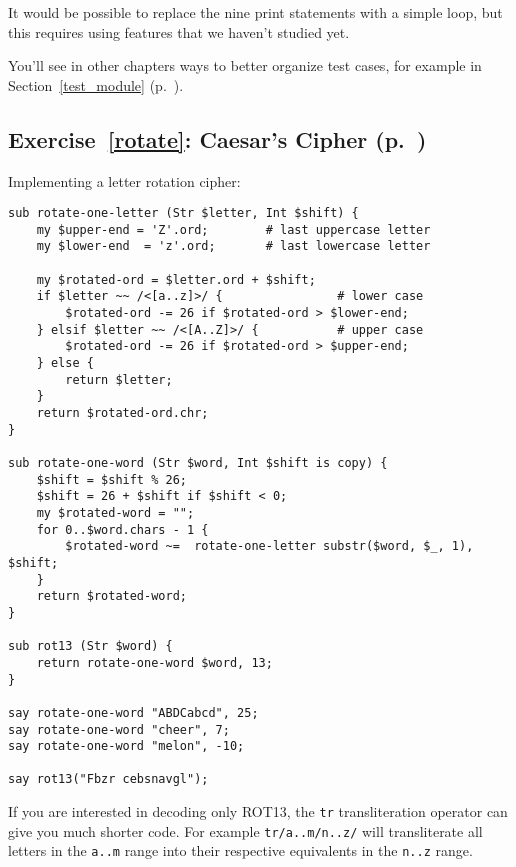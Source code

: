 It would be possible to replace the nine print statements 
with a simple loop, but this requires using features that we 
haven't studied yet.

You'll see in other chapters ways to better organize test cases,  
for example in Section~\ref{test_module} (p.~\pageref{test_module}).

\subsection{Exercise~\ref{rotate}: Caesar's Cipher (p.~\pageref{rotate})}
\label{sol_rotate}

Implementing a letter rotation cipher:

\begin{verbatim}
sub rotate-one-letter (Str $letter, Int $shift) {
    my $upper-end = 'Z'.ord;        # last uppercase letter
    my $lower-end  = 'z'.ord;       # last lowercase letter

    my $rotated-ord = $letter.ord + $shift;
    if $letter ~~ /<[a..z]>/ {                # lower case
        $rotated-ord -= 26 if $rotated-ord > $lower-end;
    } elsif $letter ~~ /<[A..Z]>/ {           # upper case
        $rotated-ord -= 26 if $rotated-ord > $upper-end;
    } else {
        return $letter;
    }
    return $rotated-ord.chr;
}

sub rotate-one-word (Str $word, Int $shift is copy) {
    $shift = $shift % 26;
    $shift = 26 + $shift if $shift < 0;
    my $rotated-word = "";
    for 0..$word.chars - 1 {
        $rotated-word ~=  rotate-one-letter substr($word, $_, 1), $shift;
    }
    return $rotated-word;
}

sub rot13 (Str $word) {
    return rotate-one-word $word, 13;
} 

say rotate-one-word "ABDCabcd", 25;
say rotate-one-word "cheer", 7;
say rotate-one-word "melon", -10;

say rot13("Fbzr cebsnavgl");
\end{verbatim}

If you are interested in decoding only ROT13, the {\tt tr} 
transliteration operator can give you much shorter code. 
For example {\tt tr/a..m/n..z/} will transliterate all 
letters in the {\tt a..m} range into their respective 
equivalents in the {\tt n..z} range.

